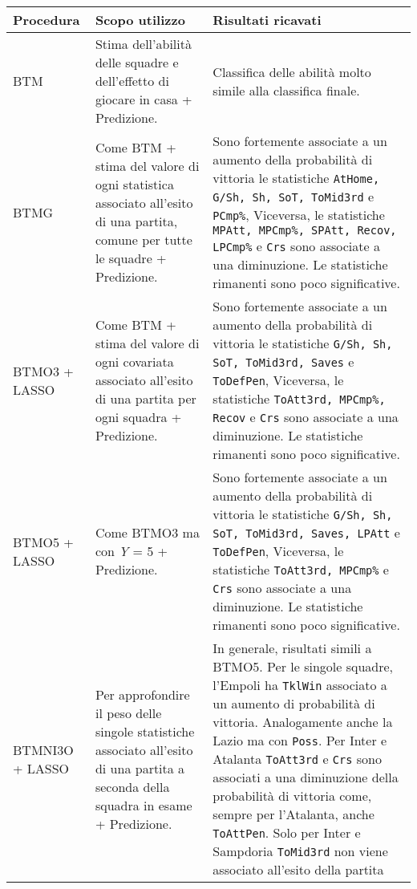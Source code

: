 \begin{table}[]
\begin{longtable}{|C{0.18\textwidth}|C{0.3\textwidth}|C{0.5\textwidth}|}
	\hline	
	\textbf{Procedura} & \textbf{Scopo utilizzo} & \textbf{Risultati ricavati}\\
	\hline			
	BTM & Stima dell'abilità delle squadre e dell'effetto di giocare in casa + Predizione. & Classifica delle abilità molto simile alla classifica finale. \\
	\hline	
	BTMG & Come BTM + stima del valore di ogni statistica associato all'esito di una partita, comune per tutte le squadre + Predizione. & Sono fortemente associate a un aumento della probabilità di vittoria le statistiche \texttt{AtHome, G/Sh, Sh, SoT, ToMid3rd} e \texttt{PCmp\%}, Viceversa, le statistiche \texttt{MPAtt, MPCmp\%, SPAtt, Recov, LPCmp\%} e \texttt{Crs} sono associate a una diminuzione. Le statistiche rimanenti sono poco significative.\\
	\hline	
	BTMO3 + LASSO & Come BTM + stima del valore di ogni covariata associato all'esito di una partita per ogni squadra + Predizione. & Sono fortemente associate a un aumento della probabilità di vittoria le statistiche \texttt{G/Sh, Sh, SoT, ToMid3rd, Saves} e \texttt{ToDefPen}, Viceversa, le statistiche \texttt{ToAtt3rd, MPCmp\%, Recov} e \texttt{Crs} sono associate a una diminuzione. Le statistiche rimanenti sono poco significative. \\
	\hline	
	BTMO5 + LASSO & Come BTMO3 ma con \emph{Y} = 5 + Predizione. & Sono fortemente associate a un aumento della probabilità di vittoria le statistiche \texttt{G/Sh, Sh, SoT, ToMid3rd, Saves, LPAtt} e \texttt{ToDefPen}, Viceversa, le statistiche \texttt{ToAtt3rd, MPCmp\%} e \texttt{Crs} sono associate a una diminuzione. Le statistiche rimanenti sono poco significative. \\
	\hline	
	BTMNI3O + LASSO & Per approfondire il peso delle singole statistiche associato all'esito di una partita a seconda della squadra in esame + Predizione. & In generale, risultati simili a BTMO5. Per le singole squadre, l'Empoli ha \texttt{TklWin} associato a un aumento di probabilità di vittoria. Analogamente anche la Lazio ma con \texttt{Poss}. Per Inter e Atalanta \texttt{ToAtt3rd} e \texttt{Crs} sono associati a una diminuzione della probabilità di vittoria come, sempre per l'Atalanta, anche \texttt{ToAttPen}. Solo per Inter e Sampdoria \texttt{ToMid3rd} non viene associato all'esito della partita\\
	\hline	

\end{longtable}
\end{table}

